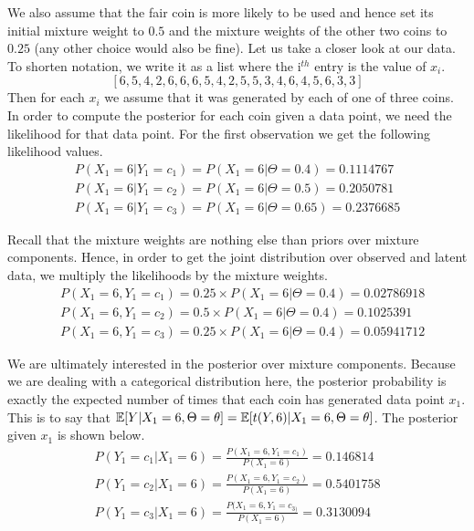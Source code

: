 We also assume that the fair coin is more likely to be used and hence set its initial mixture weight to $ 0.5 $ and the mixture weights of the 
other two coins to $ 0.25 $ (any other choice would also be fine). Let 
us take a closer look at our data. To shorten notation, we write it as a list where the i$ ^{th} $ entry is the value of $ x_{i} $.
$$ [6, 5, 4, 2, 6, 6, 6, 5, 4, 2, 5, 5, 3, 4, 6, 4, 5, 6, 3, 3 ] $$ 
Then for each $ x_{i} $ we assume that it was generated by each of one of three coins. In order to compute the posterior for each coin given a data point, we need
the likelihood for that data point. For the first observation we get the following likelihood values.
\begin{align}
&P(X_{1}=6|Y_{1} = c_{1}) = P(X_{1}=6|\Theta=0.4) = 0.1114767& \\
&P(X_{1}=6|Y_{1} = c_{2}) = P(X_{1}=6|\Theta=0.5) = 0.2050781& \nonumber \\ 
&P(X_{1}=6|Y_{1} = c_{3}) = P(X_{1}=6|\Theta=0.65) = 0.2376685& \nonumber
\end{align}

Recall that the mixture weights are nothing else than priors over mixture components. Hence, in order to get the joint distribution over observed and
latent data, we multiply the likelihoods by the mixture weights.
\begin{align}
&P(X_{1}=6,Y_{1} = c_{1}) = 0.25 \times P(X_{1}=6|\Theta=0.4) = 0.02786918 \\
&P(X_{1}=6,Y_{1} = c_{2}) = 0.5 \times P(X_{1}=6|\Theta=0.4)  = 0.1025391 \nonumber \\ 
&P(X_{1}=6,Y_{1} = c_{3}) =  0.25 \times P(X_{1}=6|\Theta=0.4)  = 0.05941712 \nonumber
\end{align}

We are ultimately interested in the posterior over mixture components. Because we are dealing with a categorical
distribution here, the posterior probability is exactly the expected
number of times that each coin has generated data point $ x_{1} $. This is to say that
$\mathbb{E}[Y|X_{1}=6, \Theta = \theta] = \mathbb{E}[t(Y,6)|X_{1}=6, \Theta = \theta] $. The
posterior given $ x_{1} $ is shown below.
\begin{align}\label{eq:posterior}
P(Y_{1} = c_{1}|X_{1}=6) = \frac{P(X_{1}=6,Y_{1} = c_{1})}{P(X_1 = 6)} = 0.146814 \\
P(Y_{1} = c_{2}|X_{1}=6) = \frac{P(X_{1}=6,Y_{1} = c_{2})}{P(X_1 = 6)} = 0.5401758 \nonumber \\
P(Y_{1} = c_{3}|X_{1}=6) = \frac{P(X_{1}=6,Y_{1} = c_{3)}}{P(X_1 = 6)} = 0.3130094 \nonumber
\end{align}

